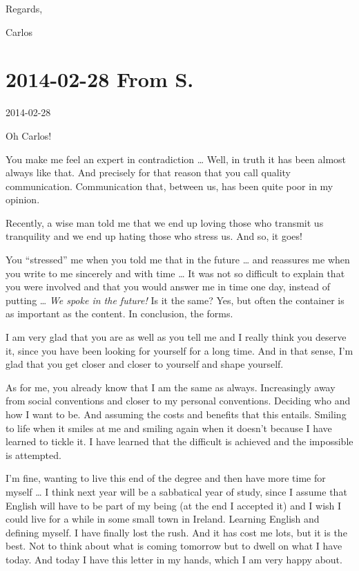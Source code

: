 \documentclass[]{book}
\begin{document}
Regards,

Carlos

\hypertarget{toS20140228}{%
\section*{2014-02-28 From S.}\label{toS20140228}}

2014-02-28

Oh Carlos!

You make me feel an expert in contradiction \ldots{} Well, in truth it has been almost always like that. And precisely for that reason that you call quality communication. Communication that, between us, has been quite poor in my opinion.

Recently, a wise man told me that we end up loving those who transmit us tranquility and we end up hating those who stress us. And so, it goes!

You ``stressed'' me when you told me that in the future \ldots{} and reassures me when you write to me sincerely and with time \ldots{} It was not so difficult to explain that you were involved and that you would answer me in time one day, instead of putting \ldots{} \emph{We spoke in the future!} Is it the same? Yes, but often the container is as important as the content. In conclusion, the forms.

I am very glad that you are as well as you tell me and I really think you deserve it, since you have been looking for yourself for a long time. And in that sense, I'm glad that you get closer and closer to yourself and shape yourself.

As for me, you already know that I am the same as always. Increasingly away from social conventions and closer to my personal conventions. Deciding who and how I want to be. And assuming the costs and benefits that this entails. Smiling to life when it smiles at me and smiling again when it doesn't because I have learned to tickle it. I have learned that the difficult is achieved and the impossible is attempted.

I'm fine, wanting to live this end of the degree and then have more time for myself \ldots{} I think next year will be a sabbatical year of study, since I assume that English will have to be part of my being (at the end I accepted it) and I wish I could live for a while in some small town in Ireland. Learning English and defining myself. I have finally lost the rush. And it has cost me lots, but it is the best. Not to think about what is coming tomorrow but to dwell on what I have today. And today I have this letter in my hands, which I am very happy about.
\end{document}
